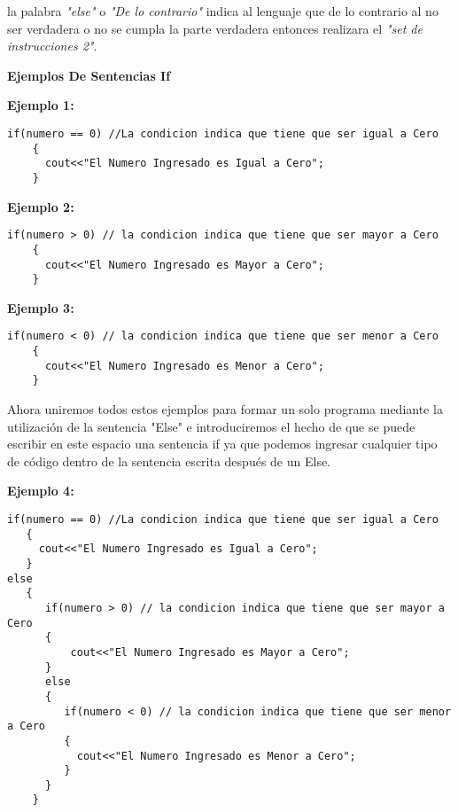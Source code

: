 la palabra \textit{"else"} o \textit{"De lo contrario"} indica al lenguaje que de lo contrario al no ser verdadera o no se cumpla la parte verdadera entonces realizara el \textit{"set de instrucciones 2"}.

\begin{center}
	\textbf{Ejemplos De Sentencias If}
\end{center}

\textbf{Ejemplo 1:}

\begin{lstlisting}[style=Cpp, label=if-ejemplo-1, caption=If Ejemplo 1]
if(numero == 0) //La condicion indica que tiene que ser igual a Cero
    {
      cout<<"El Numero Ingresado es Igual a Cero";
    }
\end{lstlisting}

\textbf{Ejemplo 2:}

\begin{lstlisting}[style=Cpp, label=if-ejemplo-2, caption=If Ejemplo 2]
if(numero > 0) // la condicion indica que tiene que ser mayor a Cero
    {    
      cout<<"El Numero Ingresado es Mayor a Cero";
    }
\end{lstlisting}

\textbf{Ejemplo 3:}

\begin{lstlisting}[style=Cpp, label=if-ejemplo-3, caption=If Ejemplo 3]
if(numero < 0) // la condicion indica que tiene que ser menor a Cero
    {    
      cout<<"El Numero Ingresado es Menor a Cero";
    }
\end{lstlisting}

Ahora uniremos todos estos ejemplos para formar un solo programa mediante la utilización de la sentencia "Else" e introduciremos el hecho de que se puede escribir en este espacio una sentencia if ya que podemos ingresar cualquier tipo de código dentro de la sentencia escrita después de un Else.

\textbf{Ejemplo 4:}

\begin{lstlisting}[style=Cpp, label=if-ejemplo-4, caption=If Ejemplo 4]
if(numero == 0) //La condicion indica que tiene que ser igual a Cero
   {
     cout<<"El Numero Ingresado es Igual a Cero";
   }
else
   {
      if(numero > 0) // la condicion indica que tiene que ser mayor a Cero
      {    
          cout<<"El Numero Ingresado es Mayor a Cero";
      }
      else
      {
         if(numero < 0) // la condicion indica que tiene que ser menor a Cero
         {    
           cout<<"El Numero Ingresado es Menor a Cero";
         }
      }
    }
\end{lstlisting}


